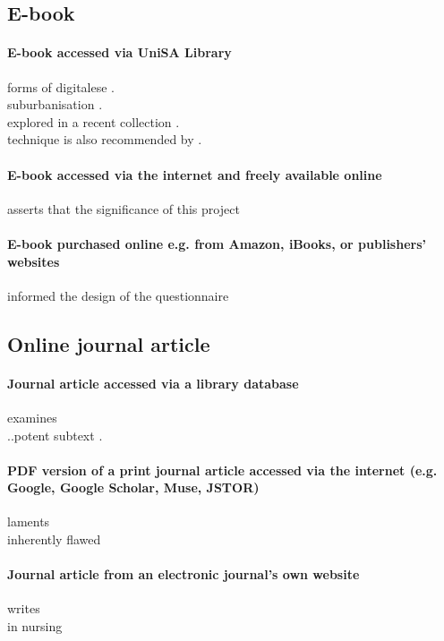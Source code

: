 \documentclass[a4paper,australian,oneside,12pt,footlines=3]{scrbook}%
\theoremstyle{remark}
\begin{document}
\begin{refsection}
\section{E-book}
\paragraph{E-book accessed via UniSA Library}
\textelp{}forms of digitalese \parencite[20]{Tagg2015}.\\
\textelp{}suburbanisation \parencite{Buxton2016}.\\
\textelp{}explored in a recent collection \parencite{Waters2015}.\\
\textelp{}technique is also recommended by \textcite{Flann2014}.

\paragraph{E-book accessed via the internet and freely available online}
\textcite{Frost2016} asserts that the significance of this project\textelp{}

\paragraph{E-book purchased online e.g. from Amazon, iBooks, or publishers’ websites}
\textelp{}informed the design of the questionnaire \parencite{Alston2012}
\printbibliography[heading=subbibliography]
\end{refsection}

\begin{refsection}
\section{Online journal article}
\paragraph{Journal article accessed via a library database}
\textcite{Boon2011} examines\textelp{}\\
..potent subtext \parencite[181]{Boon2011}.

\paragraph{PDF version of a print journal article accessed via the internet (e.g. Google, Google Scholar, Muse, JSTOR)}
\textcite[311]{Werstine1999} laments\textelp{}\\
\textelp{}inherently flawed \parencite[311]{Werstine1999}

\paragraph{Journal article from an electronic journal’s own website}
\textcite{Blamires2012} writes\textelp{}\\
\textelp{}in nursing \parencite[57]{Murray2012}
\printbibliography[heading=subbibliography]
\end{refsection}
\end{document}
